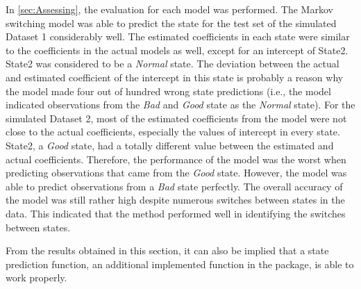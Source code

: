 \begin{comment}
This can be observed by examining the results from \ref{sec:Assessing}.
The accuracy of the model for the test set in the simulated Dataset
1 was significantly high. One reason is that the simulated data had
an obvious pattern in switching between states. Besides, each state
remained in its own state for a while before switching to the other
states. Therefore, the model can completely capture the behavior of
the time series data. In contrast, the simulated Dataset 2 had several
switches between states and each state did not have a long duration.
Even though the pattern of the response variable is rather difficult
to see in the plot, the Markov switching model still perform rather
well for this dataset.
\end{comment}

In \ref{sec:Assessing}, the evaluation for each model was performed.
The Markov switching model was able to predict the state for the test
set of the simulated Dataset 1 considerably well. The estimated coefficients
in each state were similar to the coefficients in the actual models
as well, except for an intercept of State2. State2 was considered
to be a \emph{Normal} state. The deviation between the actual and
estimated coefficient of the intercept in this state is probably a
reason why the model made four out of hundred wrong state predictions
(i.e., the model indicated observations from the \emph{Bad} and \emph{Good}
state as the \emph{Normal} state). For the simulated Dataset 2, most
of the estimated coefficients from the model were not close to the
actual coefficients, especially the values of intercept in every state.
State2, a \emph{Good }state, had a totally different value between
the estimated and actual coefficients. Therefore, the performance
of the model was the worst when predicting observations that came
from the \emph{Good} state. However, the model was able to predict
observations from a \emph{Bad} state perfectly. The overall accuracy
of the model was still rather high despite numerous switches between
states in the data. This indicated that the method performed well
in identifying the switches between states. 

From the results obtained in this section, it can also be implied
that a state prediction function, an additional implemented function
in the package, is able to work properly. 


